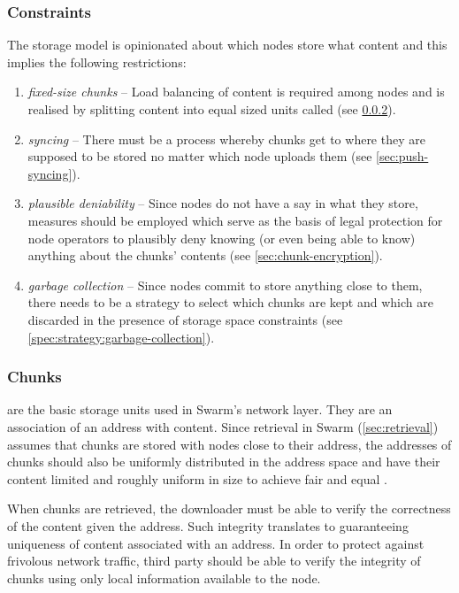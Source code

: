 \subsubsection{Constraints}
The  storage model is opinionated about which nodes store what content and this implies the following restrictions: 

\begin{enumerate}
    \item \emph{fixed-size chunks} -- Load balancing of content is required among nodes and is realised by splitting content into equal sized units called   (see \ref{sec:chunks}).
    \item \emph{syncing} -- There must be a process whereby chunks get to where they are supposed to be stored no matter which node uploads them (see \ref{sec:push-syncing}).
    \item \emph{plausible deniability} -- Since nodes do not have a say in what they store, measures should be employed which serve as the basis of legal protection for node operators to plausibly deny knowing (or even being able to know) anything about the chunks' contents (see \ref{sec:chunk-encryption}).
    \item \emph{garbage collection} -- Since nodes commit to store anything close to them, there needs to be a strategy to select which chunks are kept and which are discarded in the presence of storage space constraints (see  \ref{spec:strategy:garbage-collection}). 
\end{enumerate}

\subsubsection{Chunks}\label{sec:chunks}

 are the basic storage units used in Swarm's network layer. They are an association of an address with content. Since retrieval in Swarm (\ref{sec:retrieval}) assumes that chunks are stored with nodes close to their address,  the addresses of chunks should also be uniformly distributed in the address space and have their content limited and roughly uniform in size to achieve fair and equal .  

When chunks are retrieved, the downloader must be able to verify the correctness of the content given the address. Such integrity translates to guaranteeing uniqueness of content associated with an address. In order to protect against frivolous network traffic, third party  should be able to verify the integrity of chunks using only local information available to the node.

